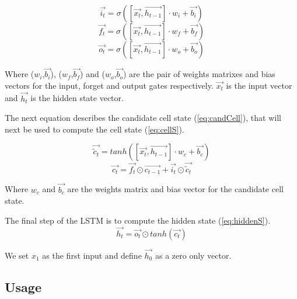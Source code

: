 \begin{equation}\label{eq:inputG}
  \overrightarrow{i_t}=\sigma ([\overrightarrow{x_{t}},\overrightarrow{h_{t-1}}]\cdot w_i + \overrightarrow{b_i})
\end{equation}
\begin{equation}\label{eq:forgetG}
  \overrightarrow{f_t}=\sigma ([\overrightarrow{x_{t}},\overrightarrow{h_{t-1}}]\cdot w_f + \overrightarrow{b_f})
\end{equation}
\begin{equation}\label{eq:outputG}
  \overrightarrow{o_t}=\sigma ([\overrightarrow{x_{t}},\overrightarrow{h_{t-1}}]\cdot w_o + \overrightarrow{b_o})
\end{equation}

Where ($w_i$,$\overrightarrow{b_i}$), ($w_f$,$\overrightarrow{b_f}$) and ($w_o$,$\overrightarrow{b_o}$) are the pair of weights matrixes and bias vectors for the input, forget and output gates respectively. $\overrightarrow{x_t}$ is the input vector and $\overrightarrow{h_t}$ is the hidden state vector.

The next equation describes the candidate cell state (\cref{eq:candCell}), that will next be used to compute the cell state (\cref{eq:cellS}).

\begin{equation}\label{eq:candCell}
  \overrightarrow{\tilde{c}_t}=tanh([\overrightarrow{x_{t}},\overrightarrow{h_{t-1}}]\cdot w_c+ \overrightarrow{b_c})
\end{equation}
\begin{equation}\label{eq:cellS}
  \overrightarrow{c_t}=\overrightarrow{f_t}\odot \overrightarrow{c_{t-1}} + \overrightarrow{i_t} \odot \overrightarrow{\tilde{c}_t}
\end{equation}

Where $w_c$ and $\overrightarrow{b_c}$ are the weights matrix and bias vector for the candidate cell state.

The final step of the \ac{LSTM} is to compute the hidden state (\cref{eq:hiddenS}).
\begin{equation}\label{eq:hiddenS}
  \overrightarrow{h_t}=\overrightarrow{o_t}\odot tanh(\overrightarrow{c_t})
\end{equation}

We set $x_1$ as the first input and define $\overrightarrow{h_0}$ as a zero only vector.

\subsection{Usage}

